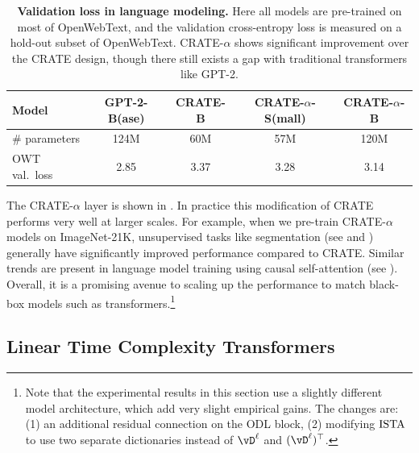 \documentclass[../../book-main.tex]{subfiles}
\begin{document}
\begin{table}
    \centering 
    \begin{tabular}{@{}lcccc@{}}
    \toprule
    Model & GPT-2-B(ase) & CRATE-B & CRATE-\(\alpha\)-S(mall) & CRATE-\(\alpha\)-B \\ 
    \midrule
    \midrule
    \# parameters & 124M & 60M & 57M & 120M \\
    OWT val.~loss & 2.85 & 3.37 & 3.28 & 3.14 \\
    \bottomrule
    \end{tabular}
    \caption{\small\textbf{Validation loss in language modeling.} Here all models are pre-trained on most of OpenWebText, and the validation cross-entropy loss is measured on a hold-out subset of OpenWebText. CRATE-\(\alpha\) shows significant improvement over the CRATE design, though there still exists a gap with traditional transformers like GPT-2.}
    \label{tab:crate_alpha_lm}
\end{table}

The CRATE-\(\alpha\) layer is shown in . In practice this modification of CRATE performs very well at larger scales. For example, when we pre-train CRATE-\(\alpha\) models on ImageNet-21K, unsupervised tasks like segmentation (see  and ) generally have significantly improved performance compared to CRATE. Similar trends are present in language model training using causal self-attention (see ). Overall, it is a promising avenue to scaling up the performance to match black-box models such as transformers.\footnote{Note that the experimental results in this section use a slightly different model architecture, which add very slight empirical gains. The changes are: (1) an additional residual connection on the ODL block, (2) modifying \(\operatorname{ISTA}\) to use two separate dictionaries instead of \(\vD^{\ell}\) and \((\vD^{\ell})^{\top}\).} 


\subsection{Linear Time Complexity Transformers}\label{sub:tost_experiments}
\end{document}
